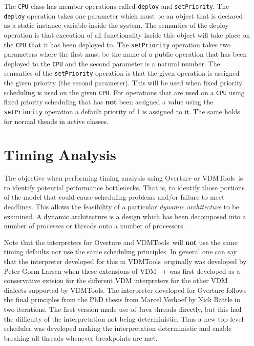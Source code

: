 \documentclass{overturerepchap}
\newcommand{\VDMTools}{VDMTools}
\begin{document}
The \texttt{CPU} class has member operations called \texttt{deploy} and
\texttt{setPriority}. The \texttt{deploy} operation takes one parameter
which must be an object that is declared as a static instance variable
inside the system. The semantics of the deploy operation is that execution
of all functionality inside this object will take place on the 
\texttt{CPU} that it
has been deployed to. The \texttt{setPriority} operation takes two 
parameters where the first must be the name of a public operation that 
has been deployed to the \texttt{CPU}
 and the second parameter is a natural number.
The semantics of the \texttt{setPriority} operation is that the given 
operation is assigned the given priority (the second parameter). This will
be used when fixed priority scheduling is used on the given
\texttt{CPU}. For operations that are used on a \texttt{CPU} using
fixed priority scheduling that has \textbf{not} been assigned a value
using the \texttt{setPriority} operation a default priority of 1 is
assigned to it. The same holds for normal theads in active classes.

\section{Timing Analysis}\label{sec:timingintro}

The objective when performing timing analysis using Overture or
\VDMTools\ is to
identify potential performance bottlenecks. That is, to identify
those portions of the model that could cause scheduling problems
and/or failure to meet deadlines. This allows the feasibility of a
particular \emph{dynamic architecture} to be examined. A dynamic
architecture is a design which has been decomposed into a number of
processes or threads onto a number of processors.

 Note that the
interpreters for Overture and \VDMTools\ will {\bf not} use the same
timing defaults nor use the same scheduling principles. In general one
can say that the interpreter developed for this in
\VDMTools\ originally was developed by Peter Gorm Larsen when these
extensions of VDM++ was first developed as a conservative extsion for
the different VDM interpreters for the other VDM dialects supported by
\VDMTools. The interpreter developed for
Overture follows the final principles from the PhD thesis from Marcel
Verhoef \cite{Verhoef08} by Nick Battle in two iterations. The first
version made use of Java threads directly, but this had the difficulty
of the interpretation not being deterministic. Thus a new top level
scheduler was developed making the interpretation deterministic and
enable breaking all threads whenever breakpoints are met. 
\end{document}
